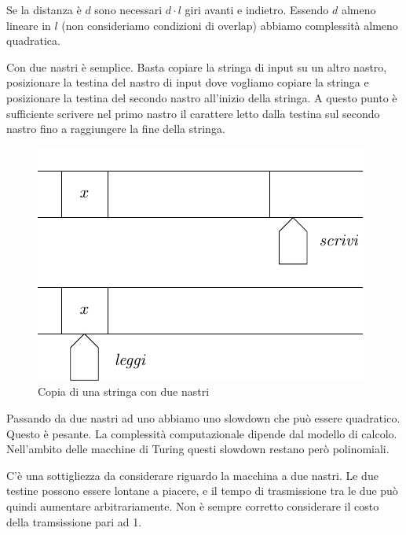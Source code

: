 Se la distanza è $d$ sono necessari $d\cdot l$ giri avanti e indietro. Essendo $d$ almeno lineare in $l$
(non consideriamo condizioni di overlap) abbiamo complessità almeno quadratica.

Con due nastri è semplice. Basta copiare la stringa di input su un altro nastro, posizionare la
testina del nastro di input dove vogliamo copiare la stringa e posizionare la testina del secondo
nastro all'inizio della stringa. A questo punto è sufficiente scrivere nel primo nastro il
carattere letto dalla testina sul secondo nastro fino a raggiungere la fine della stringa.

\begin{figure}[h]
    \begin{center}
        \includegraphics{img/CopyString2Tapes.pdf}
        \caption{Copia di una stringa con due nastri}
    \end{center}
\end{figure}

Passando da due nastri ad uno abbiamo uno slowdown che può essere quadratico. Questo è pesante. La
complessità computazionale dipende dal modello di calcolo. Nell'ambito delle macchine di Turing
questi slowdown restano però polinomiali.

C'è una sottigliezza da considerare riguardo la macchina a due nastri. Le due testine possono
essere lontane a piacere, e il tempo di trasmissione tra le due può quindi aumentare
arbitrariamente. Non è sempre corretto considerare il costo della tramsissione pari ad 1.



